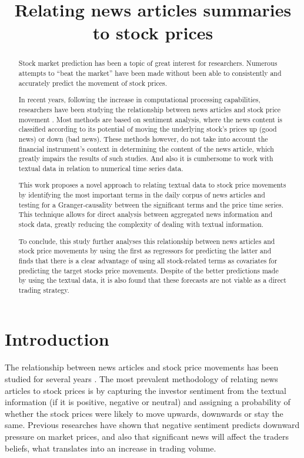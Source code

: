 \documentclass[conference,11pt]{IEEEtran}
\title{Relating news articles summaries\\ to stock prices}
\author{\IEEEauthorblockN{Marcelo Grossi}
    \IEEEauthorblockA{
    School of Computing\\
    Dublin City University\\
    Dublin, Ireland\\
    Email: marcelo.grossi2@mail.dcu.ie}
}
\begin{document}
\maketitle

\begin{abstract}
Stock market prediction has been a topic of great interest for researchers. Numerous attempts to ``beat the market'' have been made without been able to consistently and accurately predict the movement of stock prices.

\par
In recent years, following the increase in computational processing capabilities, researchers have been studying the relationship between news articles and stock price movement \citep{Fu2008,Schumaker2009}. Most methods are based on sentiment analysis, where the news content is classified according to its potential of moving the underlying stock's prices up (good news) or down (bad news). These methods however, do not take into account the financial instrument's context in determining the content of the news article, which greatly impairs the results of such studies. And also it is cumbersome to work with textual data in relation to numerical time series data.

\par
This work proposes a novel approach to relating textual data to stock price movements by identifying the most important terms in the daily corpus of news articles and testing for a Granger-causality between the significant terms and the price time series. This technique allows for direct analysis between aggregated news information and stock data, greatly reducing the complexity of dealing with textual information.

\par
To conclude, this study further analyses this relationship between news articles and stock price movements by using the first as regressors for predicting the latter and finds that there is a clear advantage of using all stock-related terms as covariates for predicting the target stocks price movements. Despite of the better predictions made by using the textual data, it is also found that these forecasts are not viable as a direct trading strategy.

\end{abstract}

\section{Introduction}
The relationship between news articles and stock price movements has been studied for several years \citep{gidofalvi2001,Fu2008}. The most prevalent methodology of relating news articles to stock prices is by capturing the investor sentiment \citep{Handbook} from the textual information (if it is positive, negative or neutral) and assigning a probability of whether the stock prices were likely to move upwards, downwards or stay the same. Previous researches \citep{Tetlock2007} have shown that negative sentiment predicts downward pressure on market prices, and also \citep{barber2008all} that significant news will affect the traders beliefs, what translates into an increase in trading volume.
\end{document}
